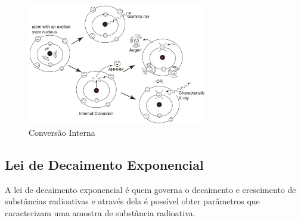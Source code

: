\documentclass[11pt,a4paper]{article}
\begin{document}
                \begin{figure}[h]
                    \centering
                    \includegraphics[width=0.7\textwidth]{Imagens/processoDeConversaoInterna.jpg}
                    \caption{Conversão Interna}
                    \label{fig:processoDeConversaoInterna}
                \end{figure}


        \subsection{Lei de Decaimento Exponencial}

            A lei de decaimento exponencial é quem governa o decaimento e crescimento de substâncias radioativas e através dela é possível obter parâmetros que caracterizam uma amostra de substância radioativa.
            
\end{document}
